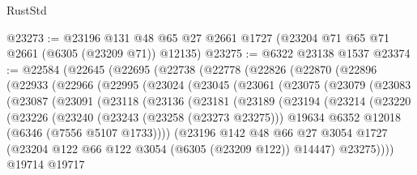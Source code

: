 \begin{lexlean}{RustStd}
\begin{coremodule}
@23273 := @23196 @131 @48 @65 @27 @2661 @1727 (@23204 @71 @65 @71 @2661 (@6305 (@23209 @71)) @12135)
@23275 := @6322 @23138 @1537
@23374 := @22584
    (@22645
      (@22695
        (@22738
          (@22778
            (@22826
              (@22870
                (@22896
                  (@22933
                    (@22966
                      (@22995
                        (@23024
                          (@23045
                            (@23061
                              (@23075
                                (@23079
                                  (@23083
                                    (@23087
                                      (@23091
                                        (@23118
                                          (@23136
                                            (@23181
                                              (@23189
                                                (@23194
                                                  (@23214
                                                    (@23220
                                                      (@23226
                                                        (@23240
                                                          (@23243 (@23258 (@23273 @23275)))
                                                          @19634
                                                          @6352
                                                          @12018
                                                          (@6346 (@7556 @5107 @1733))))
                                                      (@23196
                                                        @142
                                                        @48
                                                        @66
                                                        @27
                                                        @3054
                                                        @1727
                                                        (@23204
                                                          @122
                                                          @66
                                                          @122
                                                          @3054
                                                          (@6305 (@23209 @122))
                                                          @14447)
                                                        @23275))))
                                                @19714
                                                @19717

\end{coremodule}
\end{lexlean}

